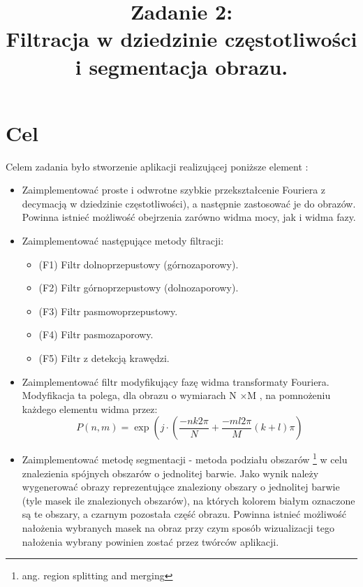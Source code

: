 \documentclass{classrep}
\author{
  \studentinfo{Paweł Musiał}{178726} \and
  \studentinfo{Łukasz Michalski}{178724}
}
\title{Zadanie 2:\\  \textbf {Filtracja w dziedzinie częstotliwości i segmentacja obrazu.}}
\begin{document}
\maketitle

\addtocounter{footnote}{1}

\tableofcontents

\section{Cel}

Celem zadania było stworzenie aplikacji realizującej poniższe element :
\begin{itemize}
\item Zaimplementować proste i odwrotne szybkie przekształcenie Fouriera z decymacją w dziedzinie częstotliwości), a następnie zastosować je do obrazów. Powinna istnieć możliwość obejrzenia zarówno widma mocy, jak i widma fazy.
\item Zaimplementować następujące metody filtracji:
	\begin{itemize}
	\item	(F1) Filtr dolnoprzepustowy (górnozaporowy).
	\item	(F2) Filtr górnoprzepustowy (dolnozaporowy).
	\item	(F3) Filtr pasmowoprzepustowy.
	\item	(F4) Filtr pasmozaporowy.
	\item	(F5) Filtr z detekcją krawędzi.
	\end{itemize}
\item Zaimplementować filtr modyfikujący fazę widma transformaty Fouriera. Modyfikacja ta polega, dla obrazu o wymiarach N ×M , na pomnożeniu każdego elementu widma przez:
\begin{equation}
P(n,m) = \exp { \left( j \cdot \left( \frac{-n k 2 \pi}{N} + \frac{-m l 2 \pi }{M} \left( k + l  \right) \pi \right) }
\end{equation}
\item Zaimplementować metodę segmentacji - metoda podziału obszarów \footnote{ang. region splitting and merging}  w celu znalezienia spójnych obszarów o jednolitej barwie. Jako wynik należy wygenerować obrazy reprezentujące znaleziony obszary o jednolitej barwie (tyle masek ile znalezionych obszarów), na których kolorem białym oznaczone są te obszary, a czarnym pozostała część obrazu. Powinna istnieć możliwość nałożenia wybranych masek na obraz przy czym sposób wizualizacji tego nałożenia wybrany powinien zostać przez twórców aplikacji.


\end{itemize}
\end{document}
